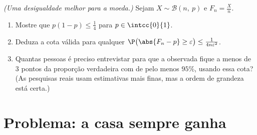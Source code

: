 \begin{exercise}[$\star\star\star$]\label{exo:g12:sums:8}
\emph{(Uma desigualdade melhor para a moeda.)} Sejam
$X \sim \mathcal B(n,\ p)$ e $F_n = \frac Xn$.
\begin{enumerate}
  \item Mostre que $p(1-p) \leq \frac14$ para $p \in \intcc{0}{1}$.
  \item Deduza a cota válida para qualquer 
        $\P\bigl(\abs{F_n - p} \geq \varepsilon\bigr) \leq
        \frac{1}{4n\varepsilon^2}$.
  \item Quantas pessoas é preciso entrevistar para que a 
        observada fique a menos de $3$ pontos da proporção verdadeira com
         de pelo menos $95\%$, usando essa cota? (As
        pesquisas reais usam estimativas mais finas, mas a ordem de
        grandeza está certa.)
\end{enumerate}
\end{exercise}

\section{Problema: a casa sempre ganha}

